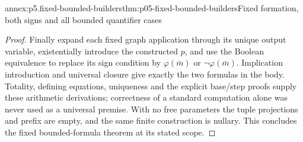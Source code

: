 \begin{annexitem}{annex:p5.fixed-bounded-builders}{thm:p05-fixed-bounded-builders}{Fixed formation, both signs and all bounded quantifier cases}
\begin{proof}
Finally expand each fixed graph application through its unique output
variable, existentially introduce the constructed \(p\), and use
the Boolean equivalence to replace its sign condition by
\(\varphi(\bar m)\) or \(\neg\varphi(\bar m)\). Implication
introduction and universal closure give exactly the two formulas in
the body. Totality, defining equations, uniqueness and the explicit
base/step proofs supply these arithmetic derivations; correctness
of a standard computation alone was never used as a universal premise.
With no free parameters the tuple projections and prefix are empty,
and the same finite construction is nullary. This concludes the
fixed bounded-formula theorem at its stated scope.
\end{proof}
\end{annexitem}
